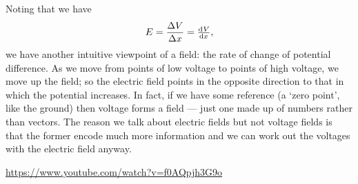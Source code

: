\documentclass[a4paper]{amsbook}
\begin{document}
Noting that we have
\begin{equation}
  E = \frac{\Delta V}{\Delta x} = \od{V}{x},
\end{equation}
we have another intuitive viewpoint of a field: the rate of change of potential difference. As we move from points of low voltage
to points of high voltage, we move up the field; so the electric field points in the opposite direction to that in which the potential
increases. In fact, if we have some reference (a `zero point', like the ground) then voltage forms a field --- just one made up of
numbers rather than vectors. The reason we talk about electric fields but not voltage fields is that the former encode much more information
and we can work out the voltages with the electric field anyway.

\begin{center}
\begin{tcolorbox}[width=0.8\textwidth,colback={red},title={\textbf{Go and watch...}},colbacktitle=yellow,coltitle=blue]
  \textcolor{white}{\url{https://www.youtube.com/watch?v=f0AQpjh3G9o}}
\end{tcolorbox}
\end{center}
\end{document}
